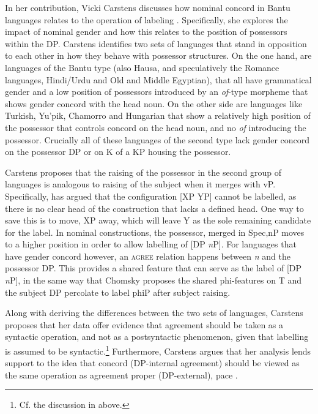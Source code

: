 \documentclass[output=paper
,modfonts
,nonflat]{langsci/langscibook}
\begin{document}
In her contribution, Vicki Carstens discusses how nominal concord in Bantu languages relates to the operation of labeling \citep{Chomsky2013,Chomsky2015}.
Specifically, she explores the impact of nominal gender and how this relates to the position of possessors within the DP.
Carstens identifies two sets of languages that stand in opposition to each other in how they behave with possessor structures.
On the one hand, are languages of the Bantu type (also Hausa, and speculatively the Romance languages, Hindi/Urdu and Old and Middle Egyptian), that all have grammatical gender and a low position of possessors introduced by an \emph{of}-type morpheme that shows gender concord with the head noun.
On the other side are languages like Turkish, Yu'pik, Chamorro and Hungarian that show a relatively high position of the possessor that controls concord on the head noun, and no \emph{of} introducing the possessor.
Crucially all of these languages of the second type lack gender concord on the possessor DP or on K of a KP housing the possessor.

Carstens proposes that the raising of the possessor in the second group of languages is analogous to raising of the subject when it merges with vP.
Specifically, \citet{Chomsky2013} has argued that the configuration [XP YP] cannot be labelled, as there is no clear head of the construction that lacks a defined head.
One way to save this is to move, XP away, which will leave Y as the sole remaining candidate for the label.
In nominal constructions, the possessor, merged in Spec,nP moves to a higher position in order to allow labelling of [DP \emph{n}P].
For languages that have gender concord however, an \textsc{agree} relation happens between \emph{n} and the possessor DP.
This provides a shared feature that can serve as the label of [DP \emph{n}P], in the same way that Chomsky proposes the shared phi-features on T and the subject DP percolate to label phiP after subject raising.

Along with deriving the differences between the two sets of languages, Carstens  proposes that her data offer evidence that agreement should be taken as a syntactic operation, and not as a postsyntactic phenomenon, given that labelling is assumed to be syntactic.\footnote{Cf. the discussion in  above.}
Furthermore, Carstens argues that her analysis lends support to the idea that concord (DP-internal agreement) should be viewed as the same operation as agreement proper (DP-external), pace \citet{Chomsky2001,Chung2013,Norris2014,Baier2015}.
\end{document}

